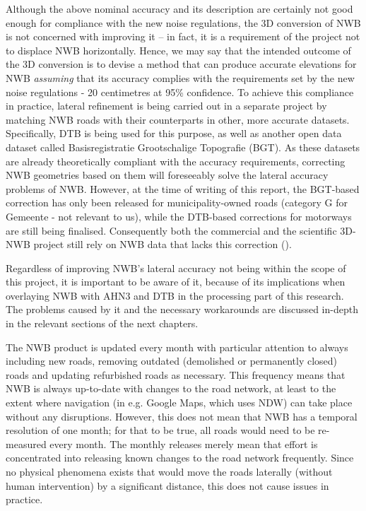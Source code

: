 Although the above nominal accuracy and its description are certainly not good enough for compliance with the new noise regulations, the 3D conversion of NWB is not concerned with improving it – in fact, it is a requirement of the project not to displace NWB horizontally. Hence, we may say that the intended outcome of the 3D conversion is to devise a method that can produce accurate elevations for NWB \textit{assuming} that its accuracy complies with the requirements set by the new noise regulations - 20 centimetres at 95\% confidence. To achieve this compliance in practice, lateral refinement is being carried out in a separate project by matching NWB roads with their counterparts in other, more accurate datasets. Specifically, DTB is being used for this purpose, as well as another open data dataset called Basisregistratie Grootschalige Topografie (BGT). As these datasets are already theoretically compliant with the accuracy requirements, correcting NWB geometries based on them will foreseeably solve the lateral accuracy problems of NWB. However, at the time of writing of this report, the BGT-based correction has only been released for municipality-owned roads (category G for Gemeente - not relevant to us), while the DTB-based corrections for motorways are still being finalised. Consequently both the commercial and the scientific 3D-NWB project still rely on NWB data that lacks this correction (\cite{nwb_gecorrigeerd}).

Regardless of improving NWB’s lateral accuracy not being within the scope of this project, it is important to be aware of it, because of its implications when overlaying NWB with AHN3 and DTB in the processing part of this research. The problems caused by it and the necessary workarounds are discussed in-depth in the relevant sections of the next chapters.

The NWB product is updated every month with particular attention to always including new roads, removing outdated (demolished or permanently closed) roads and updating refurbished roads as necessary. This frequency means that NWB is always up-to-date with changes to the road network, at least to the extent where navigation (in e.g. Google Maps, which uses NDW) can take place without any disruptions. However, this does not mean that NWB has a temporal resolution of one month; for that to be true, all roads would need to be re-measured every month. The monthly releases merely mean that effort is concentrated into releasing known changes to the road network frequently. Since no physical phenomena exists that would move the roads laterally (without human intervention) by a significant distance, this does not cause issues in practice.

